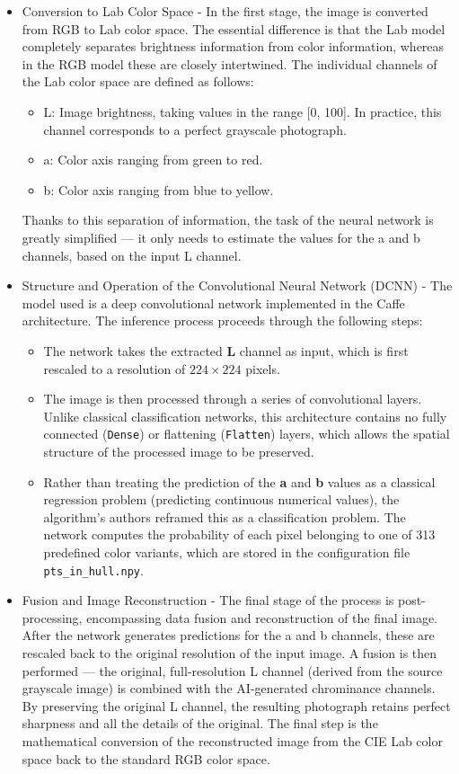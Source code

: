 \documentclass{article}
\begin{document}
\begin{itemize}
    \item Conversion to Lab Color Space - In the first stage, the image is converted from RGB to Lab color space. The essential difference is that the Lab model completely separates brightness information from color information, whereas in the RGB model these are closely intertwined. The individual channels of the Lab color space are defined as follows:
    \begin{itemize}
        \item L: Image brightness, taking values in the range [0, 100]. In practice, this channel corresponds to a perfect grayscale photograph.
        \item a: Color axis ranging from green to red.
        \item b: Color axis ranging from blue to yellow.
    \end{itemize}
    Thanks to this separation of information, the task of the neural network is greatly simplified — it only needs to estimate the values for the a and b channels, based on the input L channel.
    \item Structure and Operation of the Convolutional Neural Network (DCNN) - The model used is a deep convolutional network implemented in the Caffe architecture. The inference process proceeds through the following steps:
   \begin{itemize}
        \item The network takes the extracted \textbf{L} channel as input, which is first rescaled to a resolution of $224 \times 224$ pixels.
        \item The image is then processed through a series of convolutional layers. Unlike classical classification networks, this architecture contains no fully connected (\texttt{Dense}) or flattening (\texttt{Flatten}) layers, which allows the spatial structure of the processed image to be preserved.
        \item Rather than treating the prediction of the \textbf{a} and \textbf{b} values as a classical regression problem (predicting continuous numerical values), the algorithm's authors reframed this as a classification problem. The network computes the probability of each pixel belonging to one of 313 predefined color variants, which are stored in the configuration file \texttt{pts\_in\_hull.npy}.
    \end{itemize}
 
    \item Fusion and Image Reconstruction - The final stage of the process is post-processing, encompassing data fusion and reconstruction of the final image. After the network generates predictions for the a and b channels, these are rescaled back to the original resolution of the input image. A fusion is then performed — the original, full-resolution L channel (derived from the source grayscale image) is combined with the AI-generated chrominance channels. By preserving the original L channel, the resulting photograph retains perfect sharpness and all the details of the original. The final step is the mathematical conversion of the reconstructed image from the CIE Lab color space back to the standard RGB color space.
\end{itemize}
\end{document}
